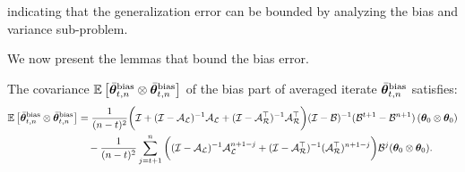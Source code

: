 \vspace{-0.2cm}
\noindent indicating that the generalization error can be bounded by analyzing the bias and variance sub-problem.
\iffalse
\begin{align}
\label{eq:genErrorExp}
\E{P(\bar{\x}_{t,n})}-P(\xs)&=\frac{1}{2}\cdot\iprod{\begin{bmatrix}\Cov&0\\0&0\end{bmatrix}}{\E{\thetavb \otimes \thetavb}}\nonumber\\
&\leq\iprod{\begin{bmatrix}\Cov&0\\0&0\end{bmatrix}}{\E{\thetavb^{\textrm{bias}} \otimes \thetavb^{\textrm{bias}}}}+\iprod{\begin{bmatrix}\Cov&0\\0&0\end{bmatrix}}{\E{\thetavb^{\textrm{variance}} \otimes \thetavb^{\textrm{variance}}}}
\end{align}
\fi
We now present the lemmas that bound the bias error.
\begin{lemma}\label{lem:average-covar-bias}
The covariance $\E{\thetavb^{\textrm{bias}} \otimes \thetavb^{\text{bias}}}$ of the bias part of averaged iterate $\thetavb^{\textrm{bias}}$ satisfies:
\vspace{-0.2cm}
{\small\begin{align*}
\E{\thetavb^{\textrm{bias}} \otimes \thetavb^{\text{bias}}} &=  \frac{1}{(n-t)^2} \bigg( \eyeT + (\eyeT-\AL)^{-1}\AL + (\eyeT-\AR\T)^{-1}\AR\T\bigg) (\eyeT-\BT)^{-1}(\BT^{t+1}-\BT^{n+1}) \left(\thetat[0]\otimes \thetat[0]\right)\\	 &\quad -\frac{1}{(n-t)^2}\sum_{j=t+1}^n\bigg( (\eyeT-\AL)^{-1}\AL^{n+1-j} + (\eyeT-\AR\T)^{-1}(\AR\T)^{n+1-j} \bigg)\BT^j (\thetat[0] \otimes \thetat[0]).
\end{align*}}%
\end{lemma}

